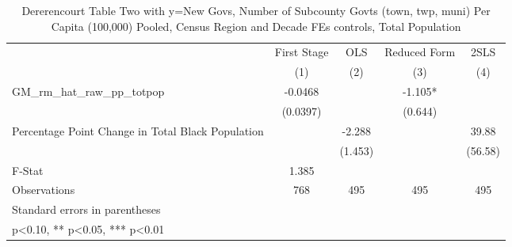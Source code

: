 \begin{table}[htbp]\centering
\def\sym#1{\ifmmode^{#1}\else\(^{#1}\)\fi}
\caption{Dererencourt Table Two with y=New Govs, Number of Subcounty Govts (town, twp, muni) Per Capita (100,000) Pooled, Census Region and Decade FEs controls, Total Population}
\begin{tabular}{l*{4}{c}}
\toprule
                    & First Stage   &         OLS   &Reduced Form   &        2SLS   \\
                    &\multicolumn{1}{c}{(1)}   &\multicolumn{1}{c}{(2)}   &\multicolumn{1}{c}{(3)}   &\multicolumn{1}{c}{(4)}   \\
\midrule
GM\_rm\_hat\_raw\_pp\_totpop&     -0.0468   &               &      -1.105*  &               \\
                    &    (0.0397)   &               &     (0.644)   &               \\
\addlinespace
Percentage Point Change in Total Black Population&               &      -2.288   &               &       39.88   \\
                    &               &     (1.453)   &               &     (56.58)   \\
\midrule
F-Stat              &       1.385   &               &               &               \\
Observations        &         768   &         495   &         495   &         495   \\
\bottomrule
\multicolumn{5}{l}{\footnotesize Standard errors in parentheses}\\
\multicolumn{5}{l}{\footnotesize * p<0.10, ** p<0.05, *** p<0.01}\\
\end{tabular}
\end{table}
